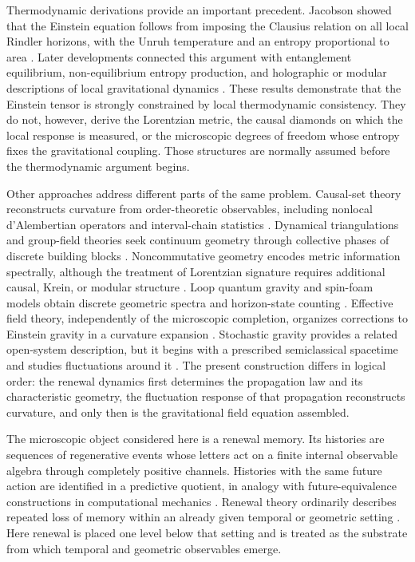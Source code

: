 \documentclass[11pt]{article}
\theoremstyle{definition}
\theoremstyle{remark}
\begin{document}
Thermodynamic derivations provide an important precedent.  Jacobson showed that the Einstein equation follows from imposing the Clausius relation on all local Rindler horizons, with the Unruh temperature and an entropy proportional to area \cite{Jacobson,Unruh1976}.  Later developments connected this argument with entanglement equilibrium, non-equilibrium entropy production, and holographic or modular descriptions of local gravitational dynamics \cite{ElingGuedensJacobson,Padmanabhan,Verlinde2011,Lashkari,FaulknerEtAl,Jacobson2016}.  These results demonstrate that the Einstein tensor is strongly constrained by local thermodynamic consistency.  They do not, however, derive the Lorentzian metric, the causal diamonds on which the local response is measured, or the microscopic degrees of freedom whose entropy fixes the gravitational coupling.  Those structures are normally assumed before the thermodynamic argument begins.

Other approaches address different parts of the same problem.  Causal-set theory reconstructs curvature from order-theoretic observables, including nonlocal d'Alembertian operators and interval-chain statistics \cite{BombelliLeeMeyerSorkin,Surya,BenincasaDowker,RoySinhaSurya}.  Dynamical triangulations and group-field theories seek continuum geometry through collective phases of discrete building blocks \cite{AmbjornJurkiewiczLoll,Oriti}.  Noncommutative geometry encodes metric information spectrally, although the treatment of Lorentzian signature requires additional causal, Krein, or modular structure \cite{Connes,ChamseddineConnes,FrancoEckstein,Strohmaier}.  Loop quantum gravity and spin-foam models obtain discrete geometric spectra and horizon-state counting \cite{Barbero,Ashtekar1986,RovelliSmolin,AshtekarLewandowski,EPRL,BarrettAsymptotics,Immirzi,DomagalaLewandowski,Meissner,AshtekarBaezKrasnov}.  Effective field theory, independently of the microscopic completion, organizes corrections to Einstein gravity in a curvature expansion \cite{Stelle1977,Donoghue1994,Burgess2004}.  Stochastic gravity provides a related open-system description, but it begins with a prescribed semiclassical spacetime and studies fluctuations around it \cite{HuVerdaguer}.  The present construction differs in logical order: the renewal dynamics first determines the propagation law and its characteristic geometry, the fluctuation response of that propagation reconstructs curvature, and only then is the gravitational field equation assembled.

The microscopic object considered here is a renewal memory.  Its histories are sequences of regenerative events whose letters act on a finite internal observable algebra through completely positive channels.  Histories with the same future action are identified in a predictive quotient, in analogy with future-equivalence constructions in computational mechanics \cite{ShaliziCrutchfield}.  Renewal theory ordinarily describes repeated loss of memory within an already given temporal or geometric setting \cite{Feller}.  Here renewal is placed one level below that setting and is treated as the substrate from which temporal and geometric observables emerge.
\end{document}
